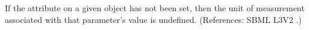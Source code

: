 If the attribute  on a given \Parameter object has not been
set, then the unit of measurement associated with that parameter's value is
undefined.  (References: SBML L3V2 .)
